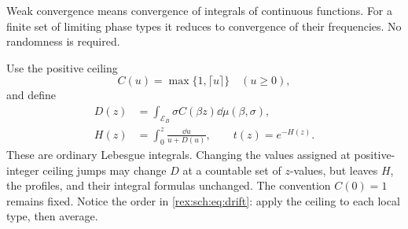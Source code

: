 Weak convergence means convergence of integrals of continuous functions.
For a finite set of limiting phase types it reduces to convergence of
their frequencies. No randomness is required.

Use the positive ceiling
\begin{equation}\label{rex:sch:eq:positive-ceiling}
 C(u)=\max\{1,\lceil u\rceil\}\quad(u\geq0),
\end{equation}
and define
\begin{align}
 D(z)&=\int_{\mathcal E_B}\sigma C(\beta z)\dd\mu(\beta,\sigma),
 \label{rex:sch:eq:drift}\\
 H(z)&=\int_0^z\frac{\dd u}{u+D(u)},\qquad t(z)=e^{-H(z)}.
 \label{rex:sch:eq:H}
\end{align}
These are ordinary Lebesgue integrals. Changing the values assigned at
positive-integer ceiling jumps may change $D$ at a countable set of
$z$-values, but leaves $H$, the profiles, and their integral formulas
unchanged. The convention $C(0)=1$ remains fixed. Notice the order in
\eqref{rex:sch:eq:drift}: apply the ceiling to each local type, then average.

